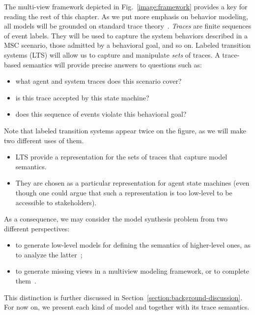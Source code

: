 The multi-view framework depicted in Fig.~\ref{image:framework} provides a key for reading the rest of this chapter. As we put more emphasis on behavior modeling, all models will be grounded on standard trace theory~\cite{Hoare:1985}. \emph{Traces} are finite sequences of event labels. They will be used to capture the system behaviors described in a MSC scenario, those admitted by a behavioral goal, and so on. Labeled transition systems (LTS) will allow us to capture and manipulate \emph{sets} of traces. A trace-based semantics will provide precise answers to questions such as:

\begin{itemize} 
\item what agent and system traces does this scenario cover?
\item is this trace accepted by this state machine?
\item does this sequence of events violate this behavioral goal?
\end{itemize}

Note that labeled transition systems appear twice on the figure, as we will make two different uses of them. 

\begin{itemize} 
\item LTS provide a representation for the sets of traces that capture model semantics. 
\item They are chosen as a particular representation for agent state machines (even though one could argue that such a representation is too low-level to be accessible to stakeholders).
\end{itemize}

As a consequence, we may consider the model synthesis problem from two different perspectives:

\begin{itemize}
\item to generate low-level models for defining the semantics of higher-level ones, as to analyze the latter~\cite{Magee:1997, Uchitel:2003, Damas:2009};
\item to generate missing views in a multiview modeling framework, or to complete them~\cite{VanLamsweerde:1998, Whittle:2000, Uchitel:2004, Damas:2005}.
\end{itemize}

This distinction is further discussed in Section~\ref{section:background-discussion}. For now on, we present each kind of model and together with its trace semantics.

